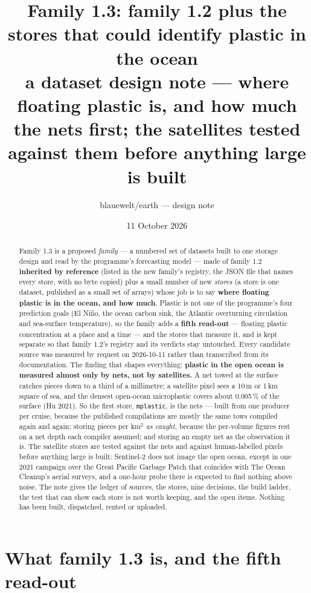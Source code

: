 \documentclass[10pt]{article}
\title{Family 1.3: family 1.2 plus the stores that could identify plastic in the ocean\\
a dataset design note --- where floating plastic is, and how much\\
\large the nets first; the satellites tested against them before anything large is built}
\author{blauewelt/earth --- design note}
\date{11 October 2026}
\newcommand{\code}[1]{\texttt{#1}}
\begin{document}
\maketitle

\begin{abstract}
Family 1.3 is a proposed \emph{family} --- a numbered set of datasets built to one storage design and read by the
programme's forecasting model --- made of family 1.2 \textbf{inherited by reference} (listed in the new family's
registry, the JSON file that names every store, with no byte copied) plus a small number of new \emph{stores} (a
store is one dataset, published as a small set of arrays) whose job is to say \textbf{where floating plastic is in
the ocean, and how much}. Plastic is not one of the programme's four prediction goals (El Ni\~no, the ocean carbon
sink, the Atlantic overturning circulation and sea-surface temperature), so the family adds a \textbf{fifth
read-out} --- floating plastic concentration at a place and a time --- and the stores that measure it, and is kept
separate so that family 1.2's registry and its verdicts stay untouched. Every candidate source was measured by
request on 2026-10-11 rather than transcribed from its documentation. The finding that shapes everything:
\textbf{plastic in the open ocean is measured almost only by nets, not by satellites.} A net towed at the surface
catches pieces down to a third of a millimetre; a satellite pixel sees a 10\,m or 1\,km square of sea, and the
densest open-ocean microplastic covers about 0.005\,\% of the surface (Hu 2021). So the first store,
\code{mplastic}, is the nets --- built from one producer per cruise, because the published compilations are mostly
the same tows compiled again and again; storing pieces per km$^2$ \emph{as caught}, because the per-volume figures
rest on a net depth each compiler assumed; and storing an empty net as the observation it is. The satellite stores
are tested against the nets and against human-labelled pixels before anything large is built: Sentinel-2 does not
image the open ocean, except in one 2021 campaign over the Great Pacific Garbage Patch that coincides with The Ocean
Cleanup's aerial surveys, and a one-hour probe there is expected to find nothing above noise. The note gives the
ledger of sources, the stores, nine decisions, the build ladder, the test that can show each store is not worth
keeping, and the open items. Nothing has been built, dispatched, rented or uploaded.
\end{abstract}

\section{What family 1.3 is, and the fifth read-out}
\end{document}
